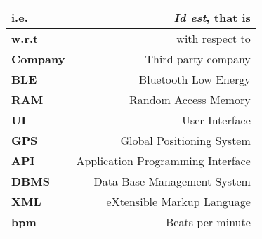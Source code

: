 \renewcommand{\arraystretch}{1.5}
\begin{center}
    \begin{tabular}{|l|r|}
        \hline
        \textbf{i.e.} & \textit{Id est}, that is  \\
        \hline
        \textbf{w.r.t} & with respect to  \\
        \hline
        \textbf{Company} & Third party company \\
        \hline
        \textbf{BLE} & Bluetooth Low Energy \\
        \hline
        \textbf{RAM} & Random Access Memory \\
        \hline
        \textbf{UI} & User Interface \\
        \hline
        \textbf{GPS} & Global Positioning System \\
        \hline
        \textbf{API} & Application Programming Interface \\
        \hline
        \textbf{DBMS} & Data Base Management System \\
        \hline
        \textbf{XML} & eXtensible Markup Language \\
        \hline
        \textbf{bpm} & Beats per minute \\
        \hline
    \end{tabular}
\end{center}